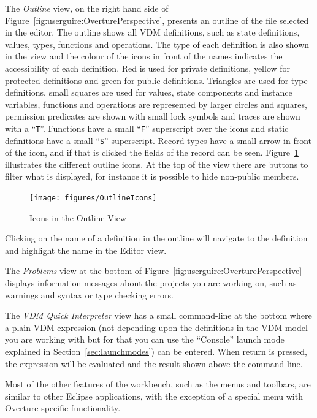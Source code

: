 \documentclass{overturerepchap}
\begin{document}
The \emph{Outline} view, on the right hand side of
Figure~\ref{fig:userguire:OverturePerspective}, presents an outline of
the file selected
in the editor. The outline shows all VDM definitions, such as
state definitions, values, types, functions and operations. The
type of each definition is also shown in the view and the colour of
the icons in front of the names indicates the accessibility of each
definition. Red is
used for private definitions, yellow for protected definitions and
green for public definitions. Triangles are used for
type definitions, small squares are used for values, state components
and instance variables, functions and operations are represented by
larger circles and squares, permission predicates are shown with small
lock symbols and traces are shown with a
``\texttt{T}''. Functions have a small ``\texttt{F}'' superscript over the
icons and static definitions have a small ``\texttt{S}'' superscript.
Record types have a small arrow in front of the
icon, and if that is clicked the fields of the record can be seen.
Figure~\ref{fig:OutlineIcons} illustrates the different outline icons.
At the top of the view there are buttons to filter what is displayed,
for instance it is possible to hide non-public members.

\begin{figure}[!htb]
\begin{center}
  \texttt{[image: figures/OutlineIcons]}
  \caption[labelInTOC]{Icons in the Outline View}
  \label{fig:OutlineIcons}
\end{center}
\end{figure}

Clicking on the name of a definition in the outline will navigate to
the definition and highlight the name in the Editor view.

The \emph{Problems} view at the bottom of
Figure~\ref{fig:userguire:OverturePerspective} displays
information messages about the projects you are
working on, such as warnings and syntax or type checking errors.

The \emph{VDM Quick Interpreter}
view has a small command-line at the bottom where a plain VDM expression
(not depending upon the definitions in the VDM model you are working
with but for that you can use the ``Console'' launch mode explained in
Section~\ref{sec:launchmodes}) can be
entered. When return is pressed, the expression will be evaluated and
the result shown above the command-line.

Most of the other features of the workbench, such as the menus and
toolbars, are similar to other Eclipse applications, with the exception
of a special menu with Overture specific functionality.
\end{document}
